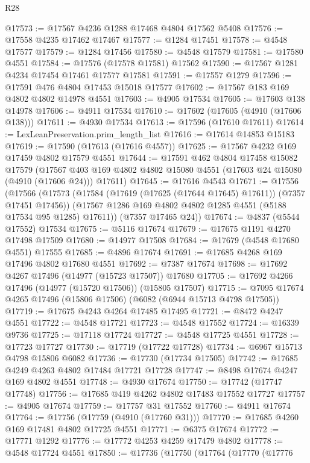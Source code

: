 \begin{lexlean}{R28}
\begin{coremodule}
@17573 := @17567 @4236 @1288 @17468 @4804 @17562 @5408
@17576 := @17558 @4235 @17462 @17467
@17577 := @1284 @17451
@17578 := @4548 @17577
@17579 := @1284 @17456
@17580 := @4548 @17579
@17581 := @17580 @4551
@17584 := @17576 (@17578 @17581) @17562
@17590 := @17567 @1281 @4234 @17454 @17461 @17577 @17581
@17591 := @17557 @1279
@17596 := @17591 @476 @4804 @17453 @15018 @17577
@17602 := @17567 @183 @169 @4802 @4802 @14978 @4551
@17603 := @4905 @17534
@17605 := @17603 @138 @14978
@17606 := @4911 @17534
@17610 := @17602 (@17605 (@4910 (@17606 @138)))
@17611 := @4930 @17534
@17613 := @17596 (@17610 @17611)
@17614 := LexLeanPreservation.prim_length_list
@17616 := @17614 @14853 @15183
@17619 := @17590 (@17613 (@17616 @4557))
@17625 := @17567 @4232 @169 @17459 @4802 @17579 @4551
@17644 := @17591
    @462
    @4804
    @17458
    @15082
    @17579
    (@17567 @403 @169 @4802 @4802 @15080 @4551 (@17603 @24 @15080 (@4910 (@17606 @24))) @17611)
@17645 := @17616 @4543
@17671 := @17556
    (@17566
      (@17573
        (@17584 (@17619 (@17625 (@17644 @17645) @17611)) (@7357 @17451 @17456))
        (@17567 @1286 @169 @4802 @4802 @1285 @4551 (@5188 @17534 @95 @1285) @17611))
      (@7357 @17465 @24))
@17674 := @4837 (@5544 @17552) @17534
@17675 := @5116 @17674
@17679 := @17675 @1191 @4270 @17498 @17509
@17680 := @14977 @17508
@17684 := @17679 (@4548 @17680 @4551) @17555
@17685 := @4896 @17674
@17691 := @17685 @4268 @169 @17496 @4802 @17680 @4551
@17692 := @7387 @17674
@17698 := @17692 @4267 @17496 (@14977 (@15723 @17507)) @17680
@17705 := @17692 @4266 @17496 (@14977 (@15720 @17506)) (@15805 @17507)
@17715 := @7095 @17674 @4265 @17496 (@15806 @17506) (@6082 (@6944 @15713 @4798 @17505))
@17719 := @17675 @4243 @4264 @17485 @17495
@17721 := @8472 @4247 @4551
@17722 := @4548 @17721
@17723 := @4548 @17552
@17724 := @16339 @9736
@17725 := @17118 @17724
@17727 := @4548 @17725 @4551
@17728 := @17723 @17727
@17730 := @17719 (@17722 @17728)
@17734 := @6967 @15713 @4798 @15806 @6082
@17736 := @17730 (@17734 @17505)
@17742 := @17685 @4249 @4263 @4802 @17484 @17721 @17728
@17747 := @8498 @17674 @4247 @169 @4802 @4551
@17748 := @4930 @17674
@17750 := @17742 (@17747 @17748)
@17756 := @17685 @419 @4262 @4802 @17483 @17552 @17727
@17757 := @4905 @17674
@17759 := @17757 @31 @17552
@17760 := @4911 @17674
@17764 := @17756 (@17759 (@4910 (@17760 @31)))
@17770 := @17685 @4260 @169 @17481 @4802 @17725 @4551
@17771 := @6375 @17674
@17772 := @17771 @1292
@17776 := @17772 @4253 @4259 @17479 @4802
@17778 := @4548 @17724 @4551
@17850 := @17736
    (@17750
      (@17764
        (@17770
          (@17776

\end{coremodule}
\end{lexlean}
